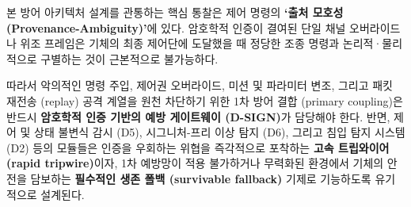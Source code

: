 
본 방어 아키텍처 설계를 관통하는 핵심 통찰은 제어 명령의 \textbf{`출처 모호성 (Provenance-Ambiguity)'}에 있다. 암호학적 인증이 결여된 단일 채널 오버라이드나 위조 프레임은 기체의 최종 제어단에 도달했을 때 정당한 조종 명령과 논리적·물리적으로 구별하는 것이 근본적으로 불가능하다.

따라서 악의적인 명령 주입, 제어권 오버라이드, 미션 및 파라미터 변조, 그리고 패킷 재전송 (replay) 공격 계열을 원천 차단하기 위한 1차 방어 결합 (primary coupling)은 반드시 \textbf{암호학적 인증 기반의 예방 게이트웨이 (D-SIGN)}가 담당해야 한다. 반면, 제어 및 상태 불변식 감시 (D5), 시그니처-프리 이상 탐지 (D6), 그리고 침입 탐지 시스템 (D2) 등의 모듈들은 인증을 우회하는 위협을 즉각적으로 포착하는 \textbf{고속 트립와이어 (rapid tripwire)}이자, 1차 예방망이 적용 불가하거나 무력화된 환경에서 기체의 안전을 담보하는 \textbf{필수적인 생존 폴백 (survivable fallback)} 기제로 기능하도록 유기적으로 설계된다.

